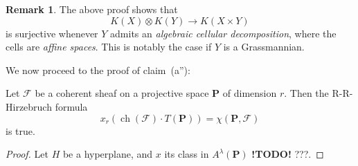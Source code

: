 \documentclass{article}
\theoremstyle{plain}
\newenvironment{proposition}[1]
    {\renewcommand\theinnercustomproposition{#1}\innercustomproposition}
    {\endinnercustomproposition}
\theoremstyle{definition}
\newtheorem*{remark}{Remark}
\newcommand{\sh}{\mathscr}
\newcommand{\PP}{\mathbf{P}}
\DeclareMathOperator{\ch}{ch}
\newcommand{\todo}{\textbf{ !TODO! }}
\newcommand{\oldpage}[1]{\marginpar{\footnotesize$\Big\vert$ \textit{p.~#1}}}
\begin{document}
\begin{remark}
  The above proof shows that
  \[
    K(X)\otimes K(Y) \to K(X\times Y)
  \]
  is surjective whenever $Y$ admits an \emph{algebraic cellular decomposition}, where the cells are \emph{affine spaces}.
  This is notably the case if $Y$ is a Grassmannian.
\end{remark}

We now proceed to the proof of claim~(a''):

\begin{proposition}{10}
\label{proposition10}
  Let $\sh{F}$ be a coherent sheaf on a projective space $\PP$
\oldpage{119}
  of dimension $r$.
  Then the R-R-Hirzebruch formula
  \[
    x_r(\ch(\sh{F})\cdot T(\PP)) = \chi(\PP,\sh{F})
  \]
  is true.
\end{proposition}

\begin{proof}
  Let $H$ be a hyperplane, and $x$ its class in $A^\lambda(\PP)$ \todo???.
\end{proof}



\nocite{*}

\end{document}
